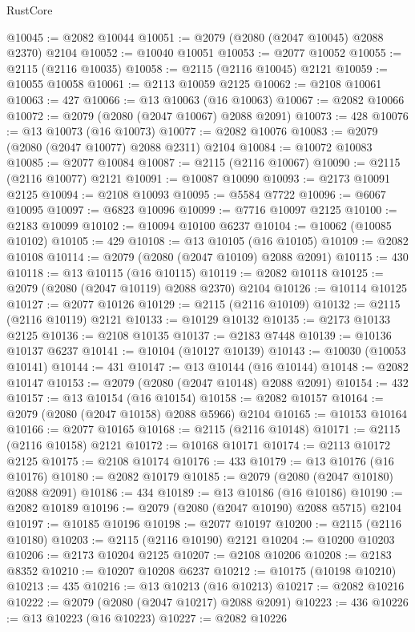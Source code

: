 \begin{lexlean}{RustCore}
\begin{coremodule}
@10045 := @2082 @10044
@10051 := @2079 (@2080 (@2047 @10045) @2088 @2370) @2104
@10052 := @10040 @10051
@10053 := @2077 @10052
@10055 := @2115 (@2116 @10035)
@10058 := @2115 (@2116 @10045) @2121
@10059 := @10055 @10058
@10061 := @2113 @10059 @2125
@10062 := @2108 @10061
@10063 := 427
@10066 := @13 @10063 (@16 @10063)
@10067 := @2082 @10066
@10072 := @2079 (@2080 (@2047 @10067) @2088 @2091)
@10073 := 428
@10076 := @13 @10073 (@16 @10073)
@10077 := @2082 @10076
@10083 := @2079 (@2080 (@2047 @10077) @2088 @2311) @2104
@10084 := @10072 @10083
@10085 := @2077 @10084
@10087 := @2115 (@2116 @10067)
@10090 := @2115 (@2116 @10077) @2121
@10091 := @10087 @10090
@10093 := @2173 @10091 @2125
@10094 := @2108 @10093
@10095 := @5584 @7722
@10096 := @6067 @10095
@10097 := @6823 @10096
@10099 := @7716 @10097 @2125
@10100 := @2183 @10099
@10102 := @10094 @10100 @6237
@10104 := @10062 (@10085 @10102)
@10105 := 429
@10108 := @13 @10105 (@16 @10105)
@10109 := @2082 @10108
@10114 := @2079 (@2080 (@2047 @10109) @2088 @2091)
@10115 := 430
@10118 := @13 @10115 (@16 @10115)
@10119 := @2082 @10118
@10125 := @2079 (@2080 (@2047 @10119) @2088 @2370) @2104
@10126 := @10114 @10125
@10127 := @2077 @10126
@10129 := @2115 (@2116 @10109)
@10132 := @2115 (@2116 @10119) @2121
@10133 := @10129 @10132
@10135 := @2173 @10133 @2125
@10136 := @2108 @10135
@10137 := @2183 @7448
@10139 := @10136 @10137 @6237
@10141 := @10104 (@10127 @10139)
@10143 := @10030 (@10053 @10141)
@10144 := 431
@10147 := @13 @10144 (@16 @10144)
@10148 := @2082 @10147
@10153 := @2079 (@2080 (@2047 @10148) @2088 @2091)
@10154 := 432
@10157 := @13 @10154 (@16 @10154)
@10158 := @2082 @10157
@10164 := @2079 (@2080 (@2047 @10158) @2088 @5966) @2104
@10165 := @10153 @10164
@10166 := @2077 @10165
@10168 := @2115 (@2116 @10148)
@10171 := @2115 (@2116 @10158) @2121
@10172 := @10168 @10171
@10174 := @2113 @10172 @2125
@10175 := @2108 @10174
@10176 := 433
@10179 := @13 @10176 (@16 @10176)
@10180 := @2082 @10179
@10185 := @2079 (@2080 (@2047 @10180) @2088 @2091)
@10186 := 434
@10189 := @13 @10186 (@16 @10186)
@10190 := @2082 @10189
@10196 := @2079 (@2080 (@2047 @10190) @2088 @5715) @2104
@10197 := @10185 @10196
@10198 := @2077 @10197
@10200 := @2115 (@2116 @10180)
@10203 := @2115 (@2116 @10190) @2121
@10204 := @10200 @10203
@10206 := @2173 @10204 @2125
@10207 := @2108 @10206
@10208 := @2183 @8352
@10210 := @10207 @10208 @6237
@10212 := @10175 (@10198 @10210)
@10213 := 435
@10216 := @13 @10213 (@16 @10213)
@10217 := @2082 @10216
@10222 := @2079 (@2080 (@2047 @10217) @2088 @2091)
@10223 := 436
@10226 := @13 @10223 (@16 @10223)
@10227 := @2082 @10226

\end{coremodule}
\end{lexlean}
